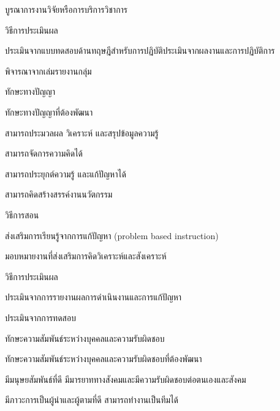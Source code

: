 \begin{edudev}
\begin{enumdev}
\begin{subenumdev}
				\item บูรณาการงานวิจัยหรือการบริการวิชาการ
				\end{subenumdev}
		\item วิธีการประเมินผล
				\begin{subenumdev}
				\item ประเมินจากแบบทดสอบด้านทฤษฎีสำหรับการปฏิบัติประเมินจากผลงานและการปฏิบัติการ
				\item พิจารณาจากเล่มรายงานกลุ่ม
				\end{subenumdev}
		\end{enumdev}
\item ทักษะทางปัญญา
		\begin{enumdev}
			\item ทักษะทางปัญญาที่ต้องพัฒนา
					\begin{subenumdev}
						\item \withbc สามารถประมวลผล วิเคราะห์ และสรุปข้อมูลความรู้
						\item \withwc สามารถจัดการความคิดได้
						\item \withbc สามารถประยุกต์ความรู้ และแก้ปัญหาได้
						\item สามารถคิดสร้างสรรค์งานนวัตกรรม
					\end{subenumdev}
			\item วิธีการสอน
					\begin{subenumdev}
						\item ส่งเสริมการเรียนรู้จากการแก้ปัญหา (problem based instruction)
						\item มอบหมายงานที่ส่งเสริมการคิดวิเคราะห์และสังเคราะห์
					\end{subenumdev}
			\item วิธีการประเมินผล
					\begin{subenumdev}
						\item ประเมินจากการรายงานผลการดำเนินงานและการแก้ปัญหา
						\item ประเมินจากการทดสอบ
					\end{subenumdev}
		\end{enumdev}
\item ทักษะความสัมพันธ์ระหว่างบุคคลและความรับผิดชอบ
		\begin{enumdev}
			\item ทักษะความสัมพันธ์ระหว่างบุคคลและความรับผิดชอบที่ต้องพัฒนา
					\begin{subenumdev}
						\item \withbc มีมนุษยสัมพันธ์ที่ดี มีมารยาททางสังคมและมีความรับผิดชอบต่อตนเองและสังคม
						\item \withbc มีภาวะการเป็นผู้นำและผู้ตามที่ดี สามารถทำงานเป็นทีมได้

\end{subenumdev}
\end{enumdev}
\end{edudev}
